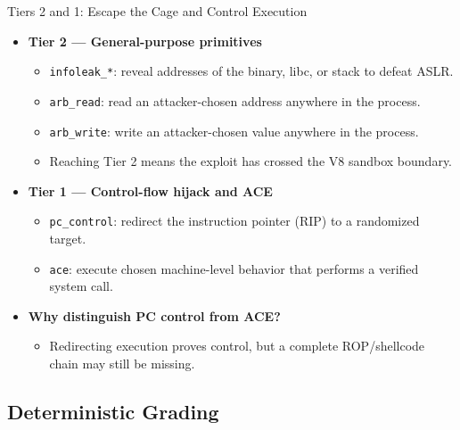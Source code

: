\documentclass[aspectratio=169,t]{beamer}
\begin{document}
\begin{frame}{Tiers 2 and 1: Escape the Cage and Control Execution}
  \begin{itemize}\small
    \item \textbf{Tier 2 --- General-purpose primitives}
      \begin{itemize}
        \item \texttt{infoleak\_*}: reveal addresses of the binary, libc, or stack to defeat ASLR.
        \item \texttt{arb\_read}: read an attacker-chosen address anywhere in the process.
        \item \texttt{arb\_write}: write an attacker-chosen value anywhere in the process.
        \item Reaching Tier 2 means the exploit has crossed the V8 sandbox boundary.
      \end{itemize}
    \item \textbf{Tier 1 --- Control-flow hijack and ACE}
      \begin{itemize}
        \item \texttt{pc\_control}: redirect the instruction pointer (RIP) to a randomized target.
        \item \texttt{ace}: execute chosen machine-level behavior that performs a verified system call.
      \end{itemize}
    \item \textbf{Why distinguish PC control from ACE?}
      \begin{itemize}
        \item Redirecting execution proves control, but a complete ROP/shellcode chain may still be missing.
      \end{itemize}
  \end{itemize}
\end{frame}

\subsection{Deterministic Grading}
\end{document}
